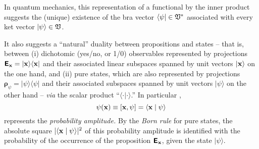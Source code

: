 {\color{Purple}
In quantum mechanics,
this representation of a functional by the inner product suggests
the (unique) existence of
the bra vector $\langle \psi \vert \in {\frak V}^\ast $
associated with every ket vector $\vert \psi \rangle \in {\frak V}$.

It also suggests a ``natural'' duality between
propositions and states
--
that is, between (i)
dichotomic (yes/no, or 1/0) observables
represented by projections $\textsf{\textbf{E}}_{\bf x}= \vert {\bf x} \rangle \langle {\bf x} \vert$
and their associated linear subspaces  spanned by unit vectors  $\vert {\bf x} \rangle $
on the one hand,
and (ii) pure states, which are also represented by projections $\boldsymbol{\rho}_{\psi}= \vert \psi \rangle \langle \psi \vert$
and their associated subspaces spanned by unit vectors  $ \vert {\psi} \rangle$
on the other hand
--
{\em via} the scalar product ``$\langle \cdot \vert \cdot \rangle$.''
In particular \cite{hamhalter-book},
\begin{equation}
{{\psi}} ({\bf x}) \equiv [{\bf x},  \psi ]= \langle {\bf x} \mid \psi \rangle
\end{equation}
represents the {\em probability amplitude.}
By the {\em Born rule}
for pure states,
the absolute square $\vert \langle {\bf x} \mid \psi \rangle \vert^2$
of this probability amplitude is identified with the probability of the occurrence of the proposition
$\textsf{\textbf{E}}_{\bf x}$,
given the state  $ \vert {\psi} \rangle$.

}
